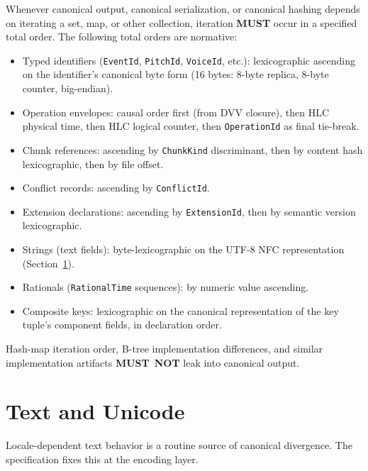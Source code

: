 \documentclass[11pt,letterpaper]{report}
\newcounter{requirement}[chapter]
\newcommand{\MUST}{\textbf{MUST}}
\newcommand{\MUSTNOT}{\textbf{MUST}\nobreak\ \textbf{NOT}}
\begin{document}
\begin{requirement}
  \label{req:determinism:canonical-collection-order}
  Whenever canonical output, canonical serialization, or canonical
  hashing depends on iterating a set, map, or other collection,
  iteration \MUST{} occur in a specified total order. The
  following total orders are normative:

  \begin{itemize}
    \item Typed identifiers (\texttt{EventId},
      \texttt{PitchId}, \texttt{VoiceId}, etc.): lexicographic
      ascending on the identifier's canonical byte form
      (16 bytes: 8-byte replica, 8-byte counter, big-endian).
    \item Operation envelopes: causal order first (from DVV
      closure), then HLC physical time, then HLC logical
      counter, then \texttt{OperationId} as final tie-break.
    \item Chunk references: ascending by \texttt{ChunkKind}
      discriminant, then by content hash lexicographic, then by
      file offset.
    \item Conflict records: ascending by \texttt{ConflictId}.
    \item Extension declarations: ascending by
      \texttt{ExtensionId}, then by semantic version
      lexicographic.
    \item Strings (text fields): byte-lexicographic on the UTF-8
      NFC representation (Section~\ref{sec:det:text}).
    \item Rationals (\texttt{RationalTime} sequences): by
      numeric value ascending.
    \item Composite keys: lexicographic on the canonical
      representation of the key tuple's component fields, in
      declaration order.
  \end{itemize}

  Hash-map iteration order, B-tree implementation differences,
  and similar implementation artifacts \MUSTNOT{} leak into
  canonical output.
\end{requirement}

\section{Text and Unicode}
\label{sec:det:text}

Locale-dependent text behavior is a routine source of canonical
divergence. The specification fixes this at the encoding layer.
\end{document}
